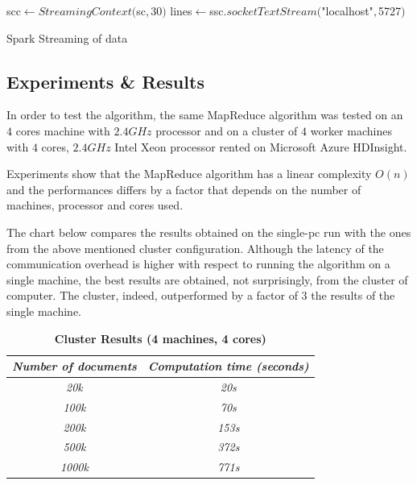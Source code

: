 \begin{algorithm}
  
    scc$\leftarrow$$StreamingContext($sc$, $30$)$\;
    lines$\leftarrow$ssc.$socketTextStream($"localhost"$, $5727$)$\;
    	
    \caption{Spark Streaming of data}\label{alg6}
    
\end{algorithm}


\subsection{Experiments \& Results}

In order to test the algorithm, the same MapReduce algorithm was tested on an $4$ cores machine with $2.4GHz$ processor and on a cluster of $4$ worker machines with $4$ cores, $2.4 GHz$ Intel Xeon processor rented on Microsoft Azure HDInsight.

Experiments show that the MapReduce algorithm has a linear complexity $O(n)$ and the performances differs by a factor that depends on the number of machines, processor and cores used.

The chart below compares the results obtained on the single-pc run with the ones from the above mentioned cluster configuration. Although the latency of the communication overhead is higher with respect to running the algorithm on a single machine, the best results are obtained, not surprisingly, from the cluster of computer. The cluster, indeed, outperformed by a factor of 3 the results of the single machine.


\begin{table}[h]
\centering
\caption{{\bfseries Cluster Results (4 machines, 4 cores)}}
\label{my-label}
\begin{tabular}{@{}cc@{}}
\toprule
\textit{\textbf{Number of documents}} & \textit{\textbf{Computation time (seconds)}} \\ \midrule
\textit{20k}                          & \textit{20s}                                 \\
\textit{100k}                         & \textit{70s}                                 \\
\textit{200k}                         & \textit{153s}                                \\
\textit{500k}                         & \textit{372s}                                \\
\textit{1000k}                         & \textit{771s}                                \\ \bottomrule
\end{tabular}
\end{table}

